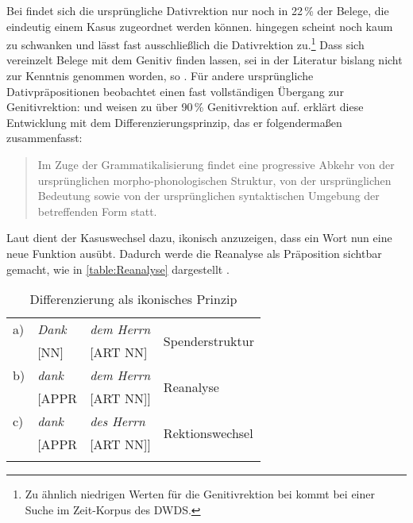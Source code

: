 Bei  findet sich die ursprüngliche Dativrektion nur noch in 22\,\% der Belege, die eindeutig einem Kasus zugeordnet werden können. 
 hingegen scheint noch kaum zu schwanken und lässt fast ausschließlich die Dativrektion zu.\footnote{Zu ähnlich niedrigen Werten für die Genitivrektion bei \gegenueber{} kommt \citet[9]{Krause2012b} bei einer Suche im Zeit-Korpus des DWDS.}
Dass sich vereinzelt Belege mit dem Genitiv finden lassen, sei in der Literatur bislang nicht zur Kenntnis genommen worden, so \citet[109]{DiMeola2002}. 
Für andere ursprüngliche Dativpräpositionen beobachtet \citet[209]{DiMeola2000} einen fast vollständigen Übergang zur Genitivrektion:  und  weisen zu über 90\,\% Genitivrektion auf. 
\citet[]{DiMeola2000} erklärt diese Entwicklung mit dem Differenzierungsprinzip, das er folgendermaßen zusammenfasst: 
\begin{quote}Im Zuge der Grammatikalisierung findet eine progressive Abkehr von der urspr{\"u}nglichen morpho-phonologischen Struktur, von der urspr{\"u}nglichen Bedeutung sowie von der urspr{\"u}nglichen syntaktischen Umgebung der betreffenden Form statt.~\citep[144]{DiMeola2000}\end{quote} 
Laut \citet[422]{DiMeola2006} dient der Kasuswechsel dazu, ikonisch anzuzeigen, dass ein Wort nun eine neue Funktion ausübt. 
Dadurch werde die Reanalyse als Präposition sichtbar gemacht, wie in \autoref{table:Reanalyse} dargestellt \citep[s.][348]{DiMeola1999}. 
\begin{table}
\centering
\begin{tabular}{llll}
\lsptoprule
a) & \textit{Dank} & \textit{dem Herrn} & \multirow{2}{*}{Spenderstruktur} \\
   & {[}NN{]}      & {[}ART NN{]}       &                                  \\
   \tablevspace
b) & \textit{dank} & \textit{dem Herrn} & \multirow{2}{*}{Reanalyse}       \\
   & {[}APPR       & {[}ART NN{]}{]}    &                                  \\
   \tablevspace
c) & \textit{dank }         & \textit{des Herrn}          & \multirow{2}{*}{Rektionswechsel} \\
   & {[}APPR       & {[}ART NN{]}{]}    &   \\
\lspbottomrule
\end{tabular}
\caption{Differenzierung als ikonisches Prinzip}
\label{table:Reanalyse}
\end{table}


